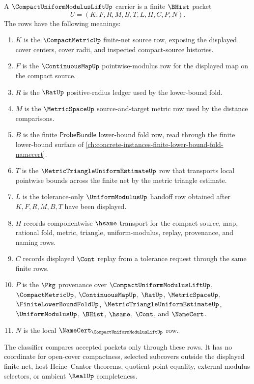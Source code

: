\begin{definition}
\label{def:compact-uniform-modulus-lift-carrier}
A $\CompactUniformModulusLiftUp$ carrier is a finite $\BHist$ packet
$$
U=(K,F,R,M,B,T,L,H,C,P,N).
$$
The rows have the following meanings:
\begin{enumerate}
\item $K$ is the $\CompactMetricUp$ finite-net source row, exposing the displayed cover centers, cover radii, and inspected compact-source histories.
\item $F$ is the $\ContinuousMapUp$ pointwise-modulus row for the displayed map on the compact source.
\item $R$ is the $\RatUp$ positive-radius ledger used by the lower-bound fold.
\item $M$ is the $\MetricSpaceUp$ source-and-target metric row used by the distance comparisons.
\item $B$ is the finite $\mathsf{ProbeBundle}$ lower-bound fold row, read through the finite lower-bound surface of \autoref{ch:concrete-instances-finite-lower-bound-fold-namecert}.
\item $T$ is the $\MetricTriangleUniformEstimateUp$ row that transports local pointwise bounds across the finite net by the metric triangle estimate.
\item $L$ is the tolerance-only $\UniformModulusUp$ handoff row obtained after $K,F,R,M,B,T$ have been displayed.
\item $H$ records componentwise $\hsame$ transport for the compact source, map, rational fold, metric, triangle, uniform-modulus, replay, provenance, and naming rows.
\item $C$ records displayed $\Cont$ replay from a tolerance request through the same finite rows.
\item $P$ is the $\Pkg$ provenance over $\CompactUniformModulusLiftUp$, $\CompactMetricUp$, $\ContinuousMapUp$, $\RatUp$, $\MetricSpaceUp$, $\FiniteLowerBoundFoldUp$, $\MetricTriangleUniformEstimateUp$, $\UniformModulusUp$, $\BHist$, $\hsame$, $\Cont$, and $\NameCert$.
\item $N$ is the local $\NameCert_{\CompactUniformModulusLiftUp}$ row.
\end{enumerate}
The classifier compares accepted packets only through these rows. It has no coordinate for open-cover compactness, selected subcovers outside the displayed finite net, host Heine--Cantor theorems, quotient point equality, external modulus selectors, or ambient $\RealUp$ completeness.
\end{definition}

